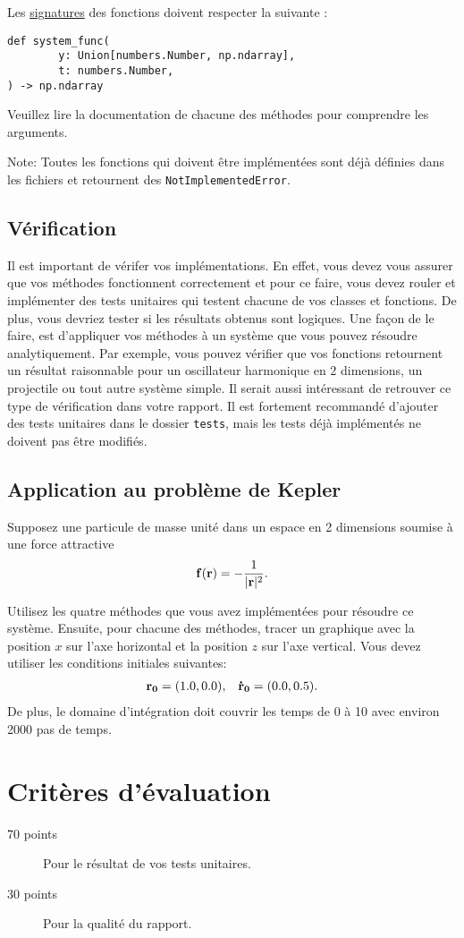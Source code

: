 \documentclass[12pt, letterpaper]{article}
\begin{document}
\bigskip

\noindent Les \href{https://python-forge.readthedocs.io/en/latest/signature.html}{signatures} des fonctions doivent
respecter la suivante :
\begin{verbatim}
def system_func(
        y: Union[numbers.Number, np.ndarray],
        t: numbers.Number,
) -> np.ndarray
\end{verbatim}

\noindent Veuillez lire la documentation de chacune des méthodes pour comprendre les arguments.

\bigskip

\noindent Note: Toutes les fonctions qui doivent être implémentées sont déjà définies dans les fichiers
et retournent des \texttt{NotImplementedError}.

\subsection{Vérification}\label{subsec:verification}

Il est important de vérifer vos implémentations.
En effet, vous devez vous assurer que vos méthodes fonctionnent correctement et pour ce faire, vous devez rouler et
implémenter des tests unitaires qui testent chacune de vos classes et fonctions.
De plus, vous devriez tester si les résultats obtenus sont logiques.
Une façon de le faire, est d'appliquer vos méthodes à un système que vous pouvez résoudre analytiquement.
Par exemple, vous pouvez vérifier que vos fonctions retournent un résultat raisonnable pour un oscillateur harmonique en
2 dimensions, un projectile ou tout autre système simple.
Il serait aussi intéressant de retrouver ce type de vérification dans votre rapport.
Il est fortement recommandé d'ajouter des tests unitaires dans le dossier \texttt{tests}, mais les tests déjà
implémentés ne doivent pas être modifiés.

\subsection{Application au problème de Kepler}\label{subsec:application-au-probleme-de-kepler}

Supposez une particule de masse unité dans un espace en 2 dimensions soumise à une force attractive
\begin{align}
  \vb{f}(\vb r) = -\frac{1}{|\vb r|^2}.
\end{align}

Utilisez les quatre méthodes que vous avez implémentées pour résoudre ce système.
Ensuite, pour chacune des méthodes, 
tracer un graphique avec la position $x$ sur l'axe horizontal
et la position $z$ sur l'axe vertical.
Vous devez utiliser les conditions initiales suivantes:
\begin{align}
  &\vb{r_0} = (1.0, 0.0),
  &\vb{\dot{r}_0} = (0.0, 0.5).
\end{align}
De plus, le domaine d'intégration doit couvrir les temps de 0 
à 10 avec environ 2000 pas de temps.


\section{Critères d'évaluation}\label{sec:criteres-d'evaluation}

\begin{description}
  \item[70 points] Pour le résultat de vos tests unitaires.
  \item[30 points] Pour la qualité du rapport.
\end{description}
\end{document}
